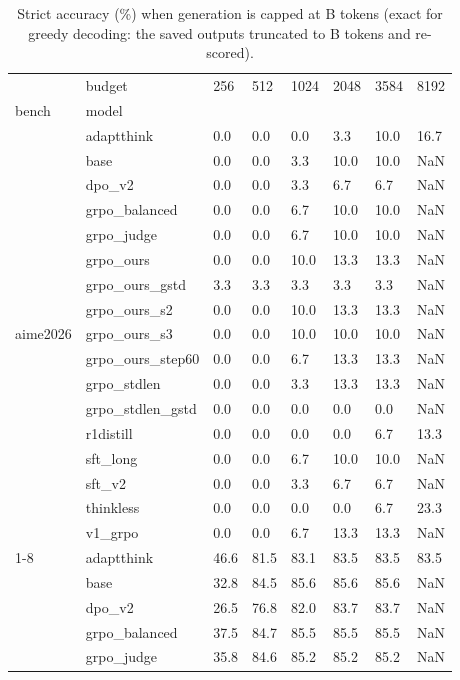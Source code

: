 \begin{table}
\caption{Strict accuracy (\%) when generation is capped at B tokens (exact for greedy decoding: the saved outputs truncated to B tokens and re-scored).}
\label{tab:budgets}
\begin{tabular}{llllllll}
\toprule
 & budget & 256 & 512 & 1024 & 2048 & 3584 & 8192 \\
bench & model &  &  &  &  &  &  \\
\midrule
\multirow[t]{17}{*}{aime2026} & adaptthink & 0.0 & 0.0 & 0.0 & 3.3 & 10.0 & 16.7 \\
 & base & 0.0 & 0.0 & 3.3 & 10.0 & 10.0 & NaN \\
 & dpo_v2 & 0.0 & 0.0 & 3.3 & 6.7 & 6.7 & NaN \\
 & grpo_balanced & 0.0 & 0.0 & 6.7 & 10.0 & 10.0 & NaN \\
 & grpo_judge & 0.0 & 0.0 & 6.7 & 10.0 & 10.0 & NaN \\
 & grpo_ours & 0.0 & 0.0 & 10.0 & 13.3 & 13.3 & NaN \\
 & grpo_ours_gstd & 3.3 & 3.3 & 3.3 & 3.3 & 3.3 & NaN \\
 & grpo_ours_s2 & 0.0 & 0.0 & 10.0 & 13.3 & 13.3 & NaN \\
 & grpo_ours_s3 & 0.0 & 0.0 & 10.0 & 10.0 & 10.0 & NaN \\
 & grpo_ours_step60 & 0.0 & 0.0 & 6.7 & 13.3 & 13.3 & NaN \\
 & grpo_stdlen & 0.0 & 0.0 & 3.3 & 13.3 & 13.3 & NaN \\
 & grpo_stdlen_gstd & 0.0 & 0.0 & 0.0 & 0.0 & 0.0 & NaN \\
 & r1distill & 0.0 & 0.0 & 0.0 & 0.0 & 6.7 & 13.3 \\
 & sft_long & 0.0 & 0.0 & 6.7 & 10.0 & 10.0 & NaN \\
 & sft_v2 & 0.0 & 0.0 & 3.3 & 6.7 & 6.7 & NaN \\
 & thinkless & 0.0 & 0.0 & 0.0 & 0.0 & 6.7 & 23.3 \\
 & v1_grpo & 0.0 & 0.0 & 6.7 & 13.3 & 13.3 & NaN \\
\cline{1-8}
\multirow[t]{17}{*}{gsm8k} & adaptthink & 46.6 & 81.5 & 83.1 & 83.5 & 83.5 & 83.5 \\
 & base & 32.8 & 84.5 & 85.6 & 85.6 & 85.6 & NaN \\
 & dpo_v2 & 26.5 & 76.8 & 82.0 & 83.7 & 83.7 & NaN \\
 & grpo_balanced & 37.5 & 84.7 & 85.5 & 85.5 & 85.5 & NaN \\
 & grpo_judge & 35.8 & 84.6 & 85.2 & 85.2 & 85.2 & NaN \\

\end{tabular}
\end{table}
